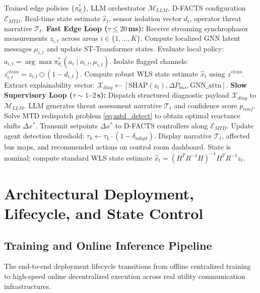 \documentclass[journal,compsoc]{IEEEtran}
\begin{document}
\begin{algorithm}[!t]
\caption{Two-Timescale Online Inference and Supervisory LLM Orchestration}
\label{alg:online_inference}
\begin{algorithmic}[1]
\REQUIRE Trained edge policies $\{\pi_{\theta_i}^*\}$, LLM orchestrator $\mathcal{M}_{LLM}$, D-FACTS configuration $\mathcal{E}_{MTD}$.
\ENSURE Real-time state estimate $\hat{x}_t$, sensor isolation vector $d_t$, operator threat narrative $\mathcal{T}_t$.
\LOOP
    \STATE \textbf{Fast Edge Loop ($\tau \le 20$\,ms):}
    \STATE Receive streaming synchrophasor measurements $z_{i,t}$ across areas $i \in \{1, \dots, K\}$.
    \STATE Compute localized GNN latent messages $\mu_{i,t}$ and update ST-Transformer states.
    \STATE Evaluate local policy: $a_{i,t} = \arg\max \pi_{\theta_i}^*(a_i \mid o_{i,t}, \mu_{i,t})$.
        \STATE Isolate flagged channels: $z_{i,t}^{clean} = z_{i,t} \odot (1 - d_{i,t})$.
        \STATE Compute robust WLS state estimate $\hat{x}_t$ using $z^{clean}$.
        \STATE Extract explainability vector: $\mathcal{X}_{diag} \leftarrow [\text{SHAP}(z_t), \Delta P_{bus}, \text{GNN\_attn}]$.
        \STATE \textbf{Slow Supervisory Loop ($\tau \sim 1$--$2$\,s):}
        \STATE Dispatch structured diagnostic payload $\mathcal{X}_{diag}$ to $\mathcal{M}_{LLM}$.
        \STATE LLM generates threat assessment narrative $\mathcal{T}_t$ and confidence score $p_{conf}$.
            \STATE Solve MTD redispatch problem \eqref{eq:mtd_detect} to obtain optimal reactance shifts $\Delta x^*$.
            \STATE Transmit setpoints $\Delta x^*$ to D-FACTS controllers along $\mathcal{E}_{MTD}$.
            \STATE Update agent detection threshold: $\tau_k \leftarrow \tau_k \cdot (1 - \delta_{adapt})$.
        \ENDIF
        \STATE Display narrative $\mathcal{T}_t$, affected bus maps, and recommended actions on control room dashboard.
    \ELSE
        \STATE State is nominal; compute standard WLS state estimate $\hat{x}_t = (H^T R^{-1} H)^{-1} H^T R^{-1} z_t$.
    \ENDIF
\ENDLOOP
\end{algorithmic}
\end{algorithm}


\section{Architectural Deployment, Lifecycle, and State Control}
\label{sec:deployment}

\subsection{Training and Online Inference Pipeline}
The end-to-end deployment lifecycle transitions from offline centralized training to high-speed online decentralized execution across real utility communication infrastructures. 
\end{document}
